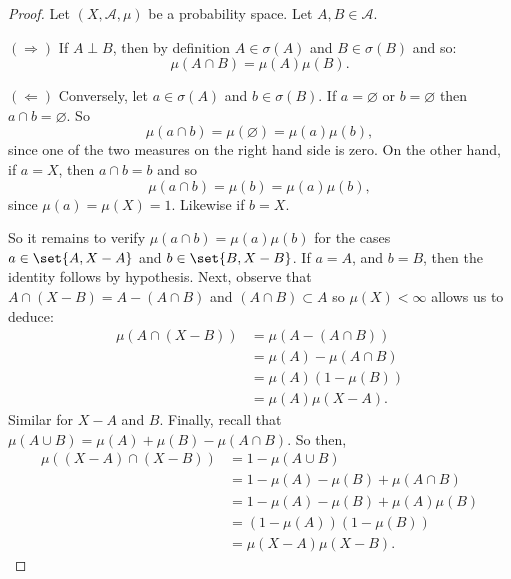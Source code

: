 \begin{proof}Let $(X, \mathcal{A} , \mu )$ be a probability space.
Let $A, B \in \mathcal{A} $.

$(\Rightarrow)$ If $A \perp  B$, then by definition $A \in \sigma (A)$ and $B \in \sigma (B)$ and so:
\[
\mu (A \cap  B) = \mu (A)\mu (B).
\]

$(\Leftarrow)$ Conversely, let $a \in \sigma (A)$ and $b \in \sigma (B)$.
If $a = \varnothing$ or $b = \varnothing$ then $a \cap  b = \varnothing$.
So
\[
\mu (a \cap  b) = \mu (\varnothing) = \mu (a)\mu (b),
\]
since one of the two measures on the right hand side is zero.
On the other hand, if $a = X$, then $a \cap  b = b$ and so
\[
\mu (a \cap  b) = \mu (b) = \mu (a)\mu (b),
\]
since $\mu (a) = \mu (X) = 1$.
Likewise if $b = X$.

So it remains to verify $\mu (a \cap  b) = \mu (a)\mu (b)$ for the cases $a \in \set{A,X -A}$ and $b \in \set{B, X-B}$.
If $a = A$, and $b = B$, then the identity follows by hypothesis.
Next, observe that $A \cap  (X - B) = A - (A \cap  B)$ and $(A \cap  B) \subset A$ so $\mu (X) < \infty$ allows us to deduce:
\[
\begin{aligned}
\mu (A \cap  (X - B)) &= \mu (A - (A \cap  B)) \\
&= \mu (A) - \mu (A \cap  B) \\
&= \mu (A)(1 - \mu (B)) \\
&= \mu (A)\mu (X - A).
\end{aligned}
\]
Similar for $X-A$ and $B$.
Finally, recall that $\mu (A \cup B) = \mu (A) + \mu (B) - \mu (A \cap  B)$.
So then,
\[
\begin{aligned}
\mu ((X - A) \cap  (X - B)) &= 1 - \mu (A \cup B) \\
&= 1 - \mu (A) - \mu (B) + \mu (A \cap  B) \\
&= 1 - \mu (A) - \mu (B) + \mu (A)\mu (B) \\
&= (1 - \mu (A))(1 - \mu (B)) \\
&= \mu (X - A)\mu (X - B).
\end{aligned}
\]
\end{proof}